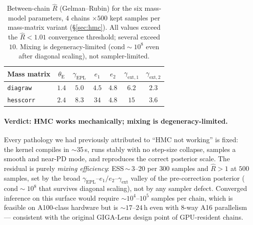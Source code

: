 \documentclass[11pt,letterpaper]{article}
\newcommand{\thetaE}{\ensuremath{\theta_{\mathrm{E}}}}
\newcommand{\gammaEPL}{\ensuremath{\gamma_{\mathrm{EPL}}}}
\newcommand{\gext}{\ensuremath{\gamma_{\mathrm{ext}}}}
\newcommand{\gextone}{\ensuremath{\gamma_{\mathrm{ext},1}}}
\newcommand{\gexttwo}{\ensuremath{\gamma_{\mathrm{ext},2}}}
\newcommand{\eone}{\ensuremath{e_{1}}}
\newcommand{\etwo}{\ensuremath{e_{2}}}
\begin{document}
\begin{table}[ht]
\centering
\caption{Between-chain $\hat R$ (Gelman--Rubin) for the six mass-model
parameters, $4$ chains $\times 500$ kept samples per mass-matrix variant
(\S\ref{sec:hmc}). All values exceed the $\hat R<1.01$ convergence
threshold; several exceed $10$. Mixing is degeneracy-limited
($\mathrm{cond}\sim10^{8}$ even after diagonal scaling), not
sampler-limited.}
\label{tab:rhat}
{\footnotesize
\begin{tabular}{lcccccc}
\hline\hline
Mass matrix & $\thetaE$ & $\gammaEPL$ & $\eone$ & $\etwo$
            & $\gextone$ & $\gexttwo$ \\
\hline
\texttt{diagraw}  & $1.4$ & $5.0$ & $4.5$ & $4.8$ & $6.2$ & $2.3$ \\
\texttt{hesscorr} & $2.4$ & $8.3$ & $34$  & $4.8$ & $15$  & $3.6$ \\
\hline
\end{tabular}}
\end{table}

\paragraph{Verdict: HMC works mechanically; mixing is
degeneracy-limited.} Every pathology we had previously attributed to
``HMC not working'' is fixed: the kernel compiles in $\sim$35\,s, runs
stably with no step-size collapse, samples a smooth and near-PD mode,
and reproduces the correct posterior scale. The residual is purely
{\it mixing efficiency}: ESS\,$\sim$\,$3$--$20$ per $300$ samples and
$\hat R>1$ at $500$ samples, set by the broad
$\gammaEPL$--$\eone/\etwo$--$\gext$ valley of the pre-correction
posterior ($\mathrm{cond}\sim10^{8}$ that survives diagonal scaling),
not by any sampler defect. Converged inference on this surface would
require $\sim$$10^{4}$--$10^{5}$ samples per chain, which is feasible on
A100-class hardware but is $\sim$$17$--$24$\,h even with $8$-way A16
parallelism --- consistent with the original GIGA-Lens design point of
GPU-resident chains.
\end{document}
